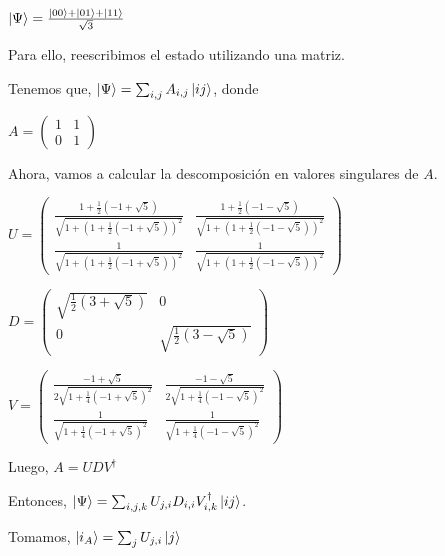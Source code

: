 \documentclass[a4paper,11pt]{article}
\begin{document}
$\left\vert{\Psi}\right\rangle = \frac{\left\vert{00}\right\rangle + \left\vert{01}\right\rangle + \left\vert{11}\right\rangle}{\sqrt{3}}$

Para ello, reescribimos el estado utilizando una matriz.

Tenemos que, $\left\vert{\Psi}\right\rangle = \sum_{i,j} A_{i,j} \left\vert{ij}\right\rangle$, donde

$A = 
\begin{pmatrix}
1 & 1\\ 
0 & 1
\end{pmatrix}
$

Ahora, vamos a calcular la descomposición en valores singulares de $A$.

$
U =
\begin{pmatrix}
\frac{1+\frac{1}{2}\left ( -1 + \sqrt{5} \right )}{\sqrt{1 + \left ( 1 +\frac{1}{2} 
\left ( -1 + \sqrt{5} \right ) \right )^2}} 

& \frac{1+\frac{1}{2}\left ( -1 - \sqrt{5} \right )}{\sqrt{1 + \left ( 1 +\frac{1}{2} 
\left ( -1 - \sqrt{5} \right ) \right )^2}} 

\\ 

\frac{1}{\sqrt{1 + \left ( 1 +\frac{1}{2} 
\left ( -1 + \sqrt{5} \right ) \right )^2}} 
 
& \frac{1}{\sqrt{1 + \left ( 1 +\frac{1}{2} 
\left ( -1 - \sqrt{5} \right ) \right )^2}} 
\end{pmatrix}
$

$
D =
\begin{pmatrix}
\sqrt{\frac{1}{2}\left ( 3 + \sqrt{5} \right )}
& 0
\\ 
0
& \sqrt{\frac{1}{2}\left ( 3 - \sqrt{5} \right )}
\end{pmatrix}
$

$V = 
\begin{pmatrix}
\frac{-1 + \sqrt{5}}{2\sqrt{1 + \frac{1}{4}\left ( -1 + \sqrt{5}\right )^2}} 

& \frac{-1 - \sqrt{5}}{2\sqrt{1 + \frac{1}{4}\left ( -1 - \sqrt{5}\right )^2}} 

\\ 

\frac{1}{\sqrt{1 + \frac{1}{4}\left ( -1 + \sqrt{5}\right )^2}} 

& \frac{1}{\sqrt{1 + \frac{1}{4}\left ( -1 - \sqrt{5}\right )^2}} 
\end{pmatrix}$

Luego, $A = U D V^{\dag}$

Entonces, $\left\vert{\Psi}\right\rangle = \sum_{i,j,k} U_{j,i} D_{i,i} V^{\dag}_{i,k}\left\vert{ij}\right\rangle$.

Tomamos, $\left\vert{i_A}\right\rangle = \sum_{j} U_{j,i}\left\vert{j}\right\rangle$
\end{document}
